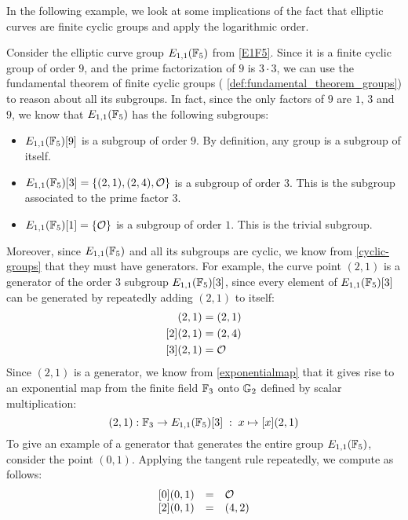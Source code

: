In the following example, we look at some implications of the fact that elliptic curves are finite cyclic groups and apply the logarithmic order.
\begin{example}\label{ex:G1G2-subgroups} Consider the elliptic curve group $E_{1,1}(\mathbb{F}_5)$ from \examplename{} \ref{E1F5}. Since it is a finite cyclic group of order $9$, and the prime factorization of $9$ is $3\cdot 3$, we can use the fundamental theorem of finite cyclic groups ( \ref{def:fundamental_theorem_groups}) to reason about all its subgroups. In fact, since the only  factors of $9$ are $1$, $3$ and $9$, we know that $E_{1,1}(\mathbb{F}_5)$ has the following subgroups:
\begin{itemize}
\item $E_{1,1}(\mathbb{F}_5)[9]$ is a subgroup of order $9$. By definition, any group is a subgroup of itself.
\item $E_{1,1}(\mathbb{F}_5)[3] = \{(2,1),(2,4),\mathcal{O}\}$ is a subgroup of order $3$. This is the subgroup associated to the prime factor $3$.
\item $E_{1,1}(\mathbb{F}_5)[1] = \{\mathcal{O}\}$ is a subgroup of order $1$. This is the trivial subgroup.
\end{itemize}
Moreover, since $E_{1,1}(\mathbb{F}_5)$ and all its subgroups are cyclic, we know from  \ref{cyclic-groups} that they must have generators. For example, the curve point $(2,1)$ is a generator of the order $3$ subgroup $E_{1,1}(\mathbb{F}_5)[3]$, since every element of $E_{1,1}(\mathbb{F}_5)[3]$ can be generated by repeatedly adding $(2,1)$ to itself: 
\begin{align*}
[1](2,1) & = (2,1) \\
[2](2,1) & = (2,4) \\
[3](2,1) & = \Oinf
\end{align*}
Since $(2,1)$ is a generator, we know from \eqref{exponentialmap} that it gives rise to an exponential map from the finite field $\mathbb{F}_3$ onto $\mathbb{G}_2$ defined by scalar multiplication:
\begin{equation}
[\cdot](2,1): \F_3 \to E_{1,1}(\F_5)[3]\; : \; x\mapsto [x](2,1) 
\end{equation}
To give an example of a generator that generates the entire group $E_{1,1}(\mathbb{F}_5)$, consider the point $(0,1)$. Applying the tangent rule repeatedly, we compute as follows:
\begin{equation}
\begin{array}{lccr}
{}\begin{array}{lcl}
{}[0](0,1) &=& \mathcal{O} \\
{}[2](0,1) &=& (4, 2) \\ 

\end{array}
\end{array}
\end{equation}
\end{example}
